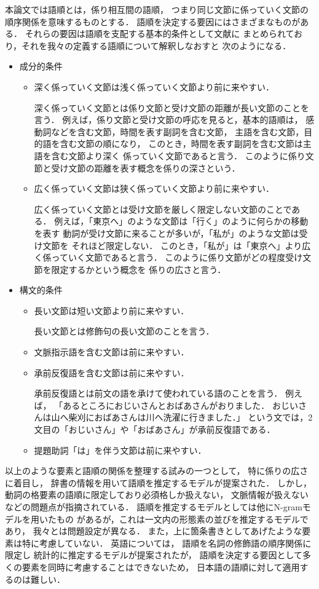 本論文では語順とは，係り相互間の語順，
つまり同じ文節に係っていく文節の順序関係を意味するものとする．
語順を決定する要因にはさまざまなものがある．
それらの要因は語順を支配する基本的条件として文献\cite{Saeki:98}に
まとめられており，それを我々の定義する語順について解釈しなおすと
次のようになる．
\begin{itemize}
\item 成分的条件
  \begin{itemize}
  \item 深く係っていく文節は浅く係っていく文節より前に来やすい．

    深く係っていく文節とは係り文節と受け文節の距離が長い文節のことを言う．
    例えば，係り文節と受け文節の呼応を見ると，基本的語順は，
    感動詞などを含む文節，時間を表す副詞を含む文節，
    主語を含む文節，目的語を含む文節の順になり，
    このとき，時間を表す副詞を含む文節は主語を含む文節より深く
    係っていく文節であると言う．
    このように係り文節と受け文節の距離を表す概念を係りの深さという．
  \item 広く係っていく文節は狭く係っていく文節より前に来やすい．

    広く係っていく文節とは受け文節を厳しく限定しない文節のことである．
    例えば，「東京へ」のような文節は「行く」のように何らかの移動を表す
    動詞が受け文節に来ることが多いが，「私が」のような文節は受け文節を
    それほど限定しない．
    このとき，「私が」は「東京へ」より広く係っていく文節であると言う．
    このように係り文節がどの程度受け文節を限定するかという概念を
    係りの広さと言う．
  \end{itemize}
\item 構文的条件
  \begin{itemize}
  \item 長い文節は短い文節より前に来やすい．
    
    長い文節とは修飾句の長い文節のことを言う．
  \item 文脈指示語を含む文節は前に来やすい．
  \item 承前反復語を含む文節は前に来やすい．
    
    承前反復語とは前文の語を承けて使われている語のことを言う．
    例えば，
    「あるところにおじいさんとおばあさんがおりました．
    おじいさんは山へ柴刈におばあさんは川へ洗濯に行きました．」
    という文では，2文目の「おじいさん」や「おばあさん」が承前反復語である．
  \item 提題助詞「は」を伴う文節は前に来やすい．
  \end{itemize}
\end{itemize}
以上のような要素と語順の関係を整理する試みの一つとして，
特に係りの広さに着目し，
辞書の情報を用いて語順を推定するモデルが提案された\cite{Tokunaga91b}．
しかし，動詞の格要素の語順に限定しており必須格しか扱えない，
文脈情報が扱えないなどの問題点が指摘されている\cite{Saeki:98}．
語順を推定するモデルとしては他にN-gramモデルを用いたもの\cite{Maruyama:94}
があるが，これは一文内の形態素の並びを推定するモデルであり，
我々とは問題設定が異なる．
また，上に箇条書きとしてあげたような要素は特に考慮していない．
英語については，
語順を名詞の修飾語の順序関係に限定し
統計的に推定するモデルが提案された\cite{Shaw:99}が，
語順を決定する要因として多くの要素を同時に考慮することはできないため，
日本語の語順に対して適用するのは難しい．

